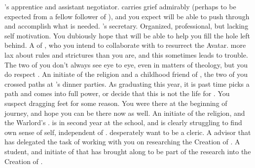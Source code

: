 \documentclass[char]{GL2020}
\begin{document}
\begin{contacts}
    \contact{\cJuniorStatesman{}} \cHeadDiplomat{}'s apprentice and assistant negotiator. \cJuniorStatesman{} carries \cJuniorStatesman{\their} grief admirably (perhaps to be expected from a fellow follower of \cEbb{}), and you expect \cJuniorStatesman{\they} will be able to push through and accomplish what is needed. 
    \contact{\cChupLeader{}} \cHeadDiplomat{}'s secretary. Organized, professional, but lacking self motivation. You dubiously hope that \cChupLeader{\they} will be able to help you fill the hole \cHeadDiplomat{} left behind.
    \contact{\cFlowPriest{}} A \cFlowPriest{\cleric} of \cFlow{}, who you intend to collaborate with to resurrect the \cEbb{} Avatar. \cFlowPriest{\Theyare} more lax about rules and strictures than you are, and this sometimes leads to trouble. The two of you don't always see eye to eye, even in matters of theology, but you do respect \cFlowPriest{\them}.
    \contact{\cInitiate{}} An initiate of the \pShippie{} religion and a childhood friend of \cPresident{}, the two of you crossed paths at \cHeadDiplomat{}’s dinner parties. As \cInitiate{\theyare} graduating this year, it is past time \cInitiate{} picks a path and comes into \cInitiate{\their} full power, or decide that this is not the life for \cInitiate{\them}. You suspect \cInitiate{\theyare} dragging \cInitiate{\their} feet for some reason. You were there at the beginning of \cInitiate{\their} journey, and hope you can be there now as well.                
     \contact{\cWarlordDaughter{}} An initiate of the \pShippie{} religion, and the Warlord's \cWarlordDaughter{\offspring}. \cWarlordDaughter{} is in \cWarlordDaughter{\their} second year at the school, and is clearly struggling to find \cWarlordDaughter{\their} own sense of self, independent of \cWarlordDaughter{\their} \cLoud{\parent}. \cWarlordDaughter{\They} desperately want\cWarlordDaughter{\verbs} to be a cleric. 
    \contact{\cHeadScientist{}} A \pTech{} advisor that \cBeetle{} has delegated the task of working with you on researching the Creation of \pEarth{}.
    \contact{\cScholarship{}} A \pTech{} student, and initiate of \cTechGod{} that \cHeadScientist{} has brought along to be part of the research into the Creation of \pEarth{}.
\end{contacts}
\end{document}
